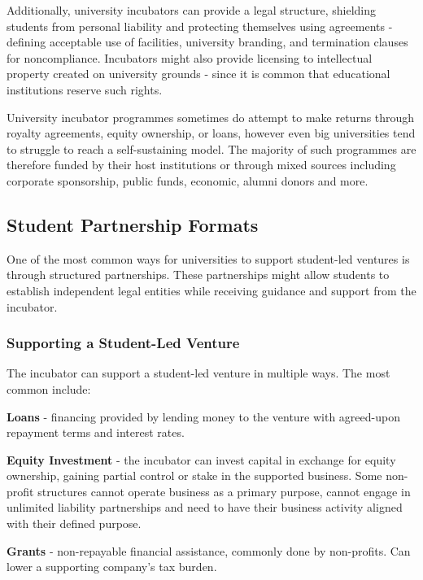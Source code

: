 Additionally, university incubators can provide a legal structure, shielding students from personal liability and protecting themselves using agreements - defining acceptable use of facilities, university branding, and termination clauses for noncompliance. Incubators might also provide licensing to intellectual property created on university grounds - since it is common that educational institutions reserve such rights.

University incubator programmes sometimes do attempt to make returns through royalty agreements, equity ownership, or loans, however even big universities tend to struggle to reach a self-sustaining model. The majority of such programmes are therefore funded by their host institutions or through mixed sources including corporate sponsorship, public funds, economic, alumni donors and more.

\subsection{Student Partnership Formats}
One of the most common ways for universities to support student-led ventures is through structured partnerships. These partnerships might allow students to establish independent legal entities while receiving guidance and support from the incubator.

\subsubsection{Supporting a Student-Led Venture}
\label{sec:label-supporting-student-venture}
The incubator can support a student-led venture in multiple ways. The most common include:

 \textbf{Loans} - financing provided by lending money to the venture with agreed-upon repayment terms and interest rates.

 \textbf{Equity Investment} - the incubator can invest capital in exchange for equity ownership, gaining partial control or stake in the supported business. Some non-profit structures cannot operate business as a primary purpose, cannot engage in unlimited liability partnerships and need to have their business activity aligned with their defined purpose.

 \textbf{Grants} - non-repayable financial assistance, commonly done by non-profits. Can lower a supporting company’s tax burden.

